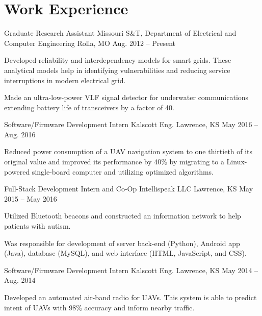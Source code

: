 \section{Work Experience}
\begin{cventries}
  \cventry
    {Graduate Research Assistant}
    {Missouri S\&T, Department of Electrical and Computer Engineering}
    {Rolla, MO}
    {Aug. 2012 -- Present}
    {
      \begin{cvitems}
        \item Developed reliability and interdependency models for smart grids. These analytical models help in identifying vulnerabilities and reducing service interruptions in modern electrical grid.
        \item Made an ultra-low-power VLF signal detector for underwater communications extending battery life of transceivers by a factor of 40.
      \end{cvitems}
    }
  \cventry
    {Software/Firmware Development Intern}
    {Kalscott Eng.}
    {Lawrence, KS}
    {May 2016 -- Aug. 2016}
    {
      \begin{cvitems}
        \item Reduced power consumption of a UAV navigation system to one thirtieth of its original value and improved its performance by 40\% by migrating to a Linux-powered single-board computer and utilizing optimized algorithms.
      \end{cvitems}
    }
  \cventry
    {Full-Stack Development Intern and Co-Op}
    {Intellispeak LLC}
    {Lawrence, KS}
    {May 2015 -- May 2016}
    {
      \begin{cvitems}
        \item Utilized Bluetooth beacons and constructed an information network to help patients with autism.
        \item Was responsible for development of server back-end (Python), Android app (Java), database (MySQL), and web interface (HTML, JavaScript, and CSS).
      \end{cvitems}
    }
  \cventry
    {Software/Firmware Development Intern}
    {Kalscott Eng.}
    {Lawrence, KS}
    {May 2014 -- Aug. 2014}
    {
      \begin{cvitems}
        \item Developed an automated air-band radio for UAVs. This system is able to predict intent of UAVs with 98\% accuracy and inform nearby traffic.

\end{cvitems}}
\end{cventries}
